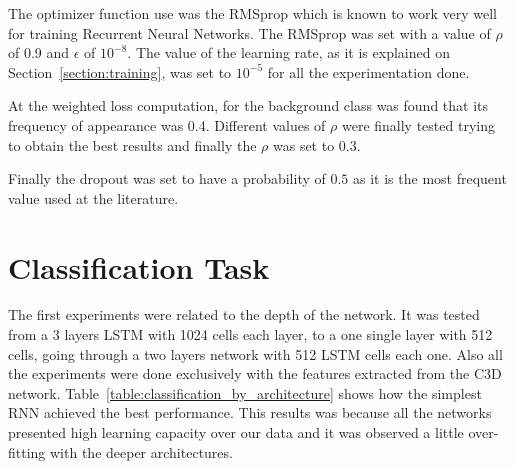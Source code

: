 The optimizer function use was the RMSprop\cite{dauphin2015rmsprop} which is known to work very well for training Recurrent Neural Networks. The RMSprop was set with a value of $\rho$ of 0.9 and $\epsilon$ of $10^{-8}$. The value of the learning rate, as it is explained on Section~\ref{section:training}, was set to $10^{-5}$ for all the experimentation done.

At the weighted loss computation, for the background class was found that its frequency of appearance was 0.4. Different values of $\rho$ were finally tested trying to obtain the best results and finally the $\rho$ was set to $0.3$.

Finally the dropout was set to have a probability of $0.5$ as it is the most frequent value used at the literature\cite{srivastava2014dropout}.



\section{Classification Task}

The first experiments were related to the depth of the network.
It was tested from a 3 layers LSTM with 1024 cells each layer, to a one single layer with 512 cells, going through a two layers network with 512 LSTM cells each one.
Also all the experiments were done exclusively with the features extracted from the C3D network.
Table~\ref{table:classification_by_architecture} shows how the simplest RNN achieved the best performance. This results was because all the networks presented high learning capacity over our data and it was observed a little over-fitting with the deeper architectures.

